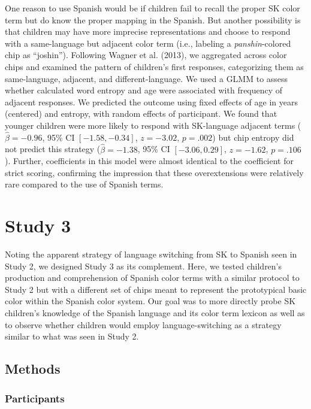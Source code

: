 \documentclass[
  english,
  ,apa7,floatsintext]{apa6}
\begin{document}
One reason to use Spanish would be if children fail to recall the proper SK color term but do know the proper mapping in the Spanish. But another possibility is that children may have more imprecise representations and choose to respond with a same-language but adjacent color term (i.e., labeling a \emph{panshin}-colored chip as ``joshin''). Following Wagner et al. (2013), we aggregated across color chips and examined the pattern of children's first responses, categorizing them as same-language, adjacent, and different-language. We used a GLMM to assess whether calculated word entropy and age were associated with frequency of adjacent responses. We predicted the outcome using fixed effects of age in years (centered) and entropy, with random effects of participant. We found that younger children were more likely to respond with SK-language adjacent terms (\(\hat{\beta} = -0.96\), 95\% CI \([-1.58, -0.34]\), \(z = -3.02\), \(p = .002\)) but chip entropy did not predict this strategy (\(\hat{\beta} = -1.38\), 95\% CI \([-3.06, 0.29]\), \(z = -1.62\), \(p = .106\)). Further, coefficients in this model were almost identical to the coefficient for strict scoring, confirming the impression that these overextensions were relatively rare compared to the use of Spanish terms.

\hypertarget{study-3}{%
\section{Study 3}\label{study-3}}

Noting the apparent strategy of language switching from SK to Spanish seen in Study 2, we designed Study 3 as its complement. Here, we tested children's production and comprehension of Spanish color terms with a similar protocol to Study 2 but with a different set of chips meant to represent the prototypical basic color within the Spanish color system. Our goal was to more directly probe SK children's knowledge of the Spanish language and its color term lexicon as well as to observe whether children would employ language-switching as a strategy similar to what was seen in Study 2.

\hypertarget{methods-2}{%
\subsection{Methods}\label{methods-2}}

\hypertarget{participants-2}{%
\subsubsection{Participants}\label{participants-2}}
\end{document}
